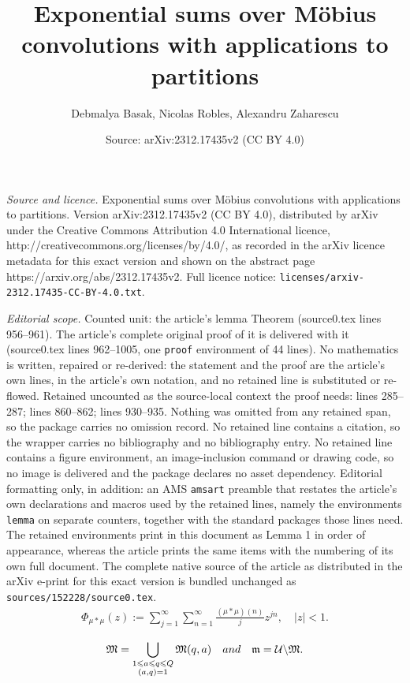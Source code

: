 \documentclass[10pt,a4paper]{amsart}
\title{Exponential sums over M\"{o}bius convolutions with applications to partitions}
\author{Debmalya Basak, Nicolas Robles, Alexandru Zaharescu}
\date{Source: arXiv:2312.17435v2 (CC BY 4.0)}
\begin{document}
\maketitle

\noindent\emph{Source and licence.} Exponential sums over M\"{o}bius convolutions with applications to partitions. Version arXiv:2312.17435v2 (CC BY 4.0), distributed by arXiv under the Creative Commons Attribution 4.0 International licence, http://creativecommons.org/licenses/by/4.0/, as recorded in the arXiv licence metadata for this exact version and shown on the abstract page https://arxiv.org/abs/2312.17435v2. Full licence notice: \texttt{licenses/arxiv-2312.17435-CC-BY-4.0.txt}.\par\smallskip

\noindent\textit{Editorial scope.} Counted unit: the article's lemma Theorem (source0.tex lines 956--961). The article's complete original proof of it is delivered with it (source0.tex lines 962--1005, one \texttt{proof} environment of 44 lines). No mathematics is written, repaired or re-derived: the statement and the proof are the article's own lines, in the article's own notation, and no retained line is substituted or re-flowed.  Retained uncounted as the source-local context the proof needs: lines 285--287; lines 860--862; lines 930--935.  Nothing was omitted from any retained span, so the package carries no omission record.  No retained line contains a citation, so the wrapper carries no bibliography and no bibliography entry.  No retained line contains a figure environment, an image-inclusion command or drawing code, so no image is delivered and the package declares no asset dependency.  Editorial formatting only, in addition: an AMS \texttt{amsart} preamble that restates the article's own declarations and macros used by the retained lines, namely the environments \texttt{lemma} on separate counters, together with the standard packages those lines need.  The retained environments print in this document as Lemma 1 in order of appearance, whereas the article prints the same items with the numbering of its own full document.  The complete native source of the article as distributed in the arXiv e-print for this exact version is bundled unchanged as \texttt{sources/152228/source0.tex}.
\begin{align}\label{eq 1.10}
    \Phi_{\mu*\mu}(z) := \sum_{j=1}^\infty \sum_{n=1}^\infty \frac{(\mu*\mu)(n)}{j} z^{jn}, \quad \lvert z \rvert <1.
\end{align}

\begin{align}\label{Major and Minor Arcs}
    \mathfrak{M} = \bigcup_{\substack{1 \leqslant a \leqslant q \leqslant Q \\ (a,q)=1}} \mathfrak{M}(q,a) \quad \textnormal{and} \quad \mathfrak{m} =  \mathcal{U} \backslash \mathfrak{M}.
\end{align}
\end{document}
